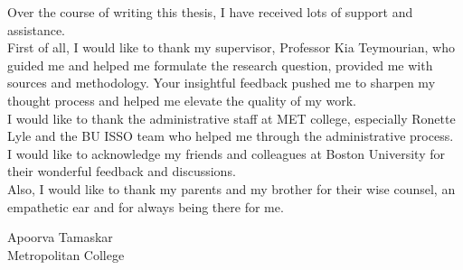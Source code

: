 Over the course of writing this thesis, I have received lots of support and assistance.\\
First of all, I would like to thank my supervisor, Professor Kia Teymourian, who guided me and helped me formulate the research question, provided me with sources and methodology. Your insightful feedback pushed me to sharpen my thought process and helped me elevate the quality of my work.\\
I would like to thank the administrative staff at MET college, especially Ronette Lyle and the BU ISSO team who helped me through the administrative process.\\
I would like to acknowledge my friends and colleagues at Boston University for their wonderful feedback and discussions.\\
Also, I would like to thank my parents and my brother for their wise counsel, an empathetic ear and for always being there for me.
\vskip 1in

\noindent
Apoorva Tamaskar\\
Metropolitan College
